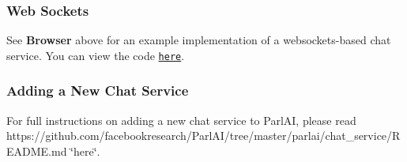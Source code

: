 \subsubsection*{Web Sockets}

See {\bfseries Browser} above for an example implementation of a websockets-\/based chat service. You can view the code \href{https://github.com/facebookresearch/ParlAI/tree/master/parlai/chat_service/services/browser_chat}{\tt here}.

\subsubsection*{Adding a New Chat Service}

For full instructions on adding a new chat service to Parl\+AI, please read https\+://github.com/facebookresearch/\+Parl\+A\+I/tree/master/parlai/chat\+\_\+service/\+R\+E\+A\+D\+M\+E.\+md \char`\"{}here\char`\"{}. 
